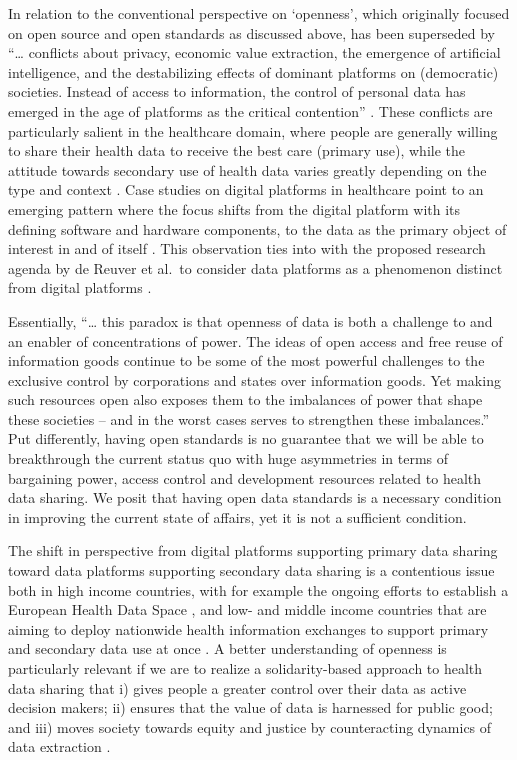 \documentclass[
  authoryear]{elsarticle}
\begin{document}
In relation to the conventional perspective on `openness', which
originally focused on open source and open standards as discussed above,
has been superseded by ``\ldots{} conflicts about privacy, economic
value extraction, the emergence of artificial intelligence, and the
destabilizing effects of dominant platforms on (democratic) societies.
Instead of access to information, the control of personal data has
emerged in the age of platforms as the critical contention''
\citep{keller2021paradox}. These conflicts are particularly salient in
the healthcare domain, where people are generally willing to share their
health data to receive the best care (primary use), while the attitude
towards secondary use of health data varies greatly depending on the
type and context \citep{cascini2024health}. Case studies on digital
platforms in healthcare point to an emerging pattern where the focus
shifts from the digital platform with its defining software and hardware
components, to the data as the primary object of interest in and of
itself \citep{ozalp2022digital, alaimo2022organizations}. This
observation ties into with the proposed research agenda by de Reuver et
al.~to consider data platforms as a phenomenon distinct from digital
platforms \citep{dereuver2018digital, dereuver2022openness}.

Essentially, ``\ldots{} this paradox is that openness of data is both a
challenge to and an enabler of concentrations of power. The ideas of
open access and free reuse of information goods continue to be some of
the most powerful challenges to the exclusive control by corporations
and states over information goods. Yet making such resources open also
exposes them to the imbalances of power that shape these societies --
and in the worst cases serves to strengthen these imbalances.'' Put
differently, having open standards is no guarantee that we will be able
to breakthrough the current status quo with huge asymmetries in terms of
bargaining power, access control and development resources related to
health data sharing. We posit that having open data standards is a
necessary condition in improving the current state of affairs, yet it is
not a sufficient condition.

The shift in perspective from digital platforms supporting primary data
sharing toward data platforms supporting secondary data sharing is a
contentious issue both in high income countries, with for example the
ongoing efforts to establish a European Health Data Space
\citep{otto2022designing}, and low- and middle income countries that are
aiming to deploy nationwide health information exchanges to support
primary and secondary data use at once \citep{mamuye2022health}. A
better understanding of openness is particularly relevant if we are to
realize a solidarity-based approach to health data sharing that i) gives
people a greater control over their data as active decision makers; ii)
ensures that the value of data is harnessed for public good; and iii)
moves society towards equity and justice by counteracting dynamics of
data extraction
\citep{kickbusch2021lancet, prainsack2022data, prainsack2023beyond}.
\end{document}
